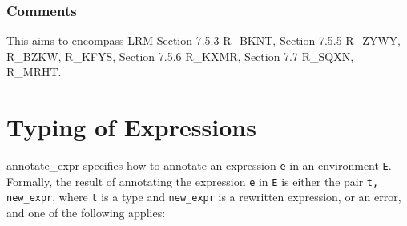 \documentclass{book}
\begin{document}
\subsection{Comments}
  This aims to encompass LRM Section 7.5.3 R\_BKNT, Section 7.5.5 R\_ZYWY, R\_BZKW,
  R\_KFYS, Section 7.5.6 R\_KXMR, Section 7.7 R\_SQXN, R\_MRHT.

\chapter{Typing of Expressions}

\textsf{annotate\_expr} specifies how to annotate an expression \texttt{e} in
an environment \texttt{E}.  Formally, the result of annotating the expression
\texttt{e} in \texttt{E} is either the pair \texttt{t, new\_expr}, where \texttt{t} is a type and
\texttt{new\_expr} is a rewritten expression, or an error, and one of the following applies:
\end{document}
